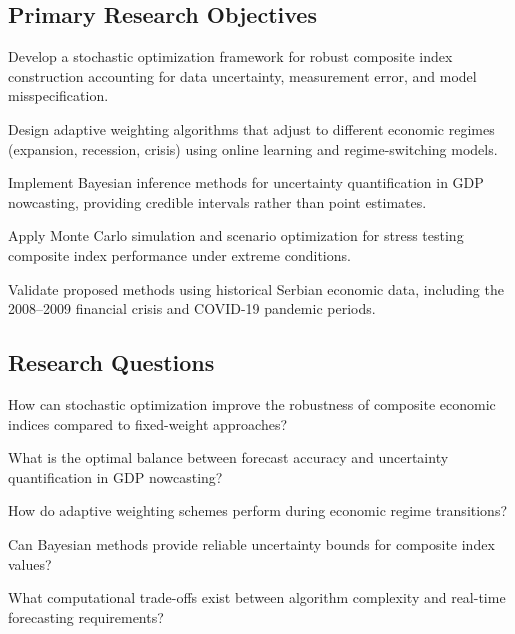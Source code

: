 \documentclass[12pt,a4paper]{article}
\begin{document}
\subsection{Primary Research Objectives}

\begin{description}[leftmargin=!,labelwidth=1cm]
    \item[RO1] Develop a stochastic optimization framework for robust composite index construction accounting for data uncertainty, measurement error, and model misspecification.
    
    \item[RO2] Design adaptive weighting algorithms that adjust to different economic regimes (expansion, recession, crisis) using online learning and regime-switching models.
    
    \item[RO3] Implement Bayesian inference methods for uncertainty quantification in GDP nowcasting, providing credible intervals rather than point estimates.
    
    \item[RO4] Apply Monte Carlo simulation and scenario optimization for stress testing composite index performance under extreme conditions.
    
    \item[RO5] Validate proposed methods using historical Serbian economic data, including the 2008--2009 financial crisis and COVID-19 pandemic periods.
\end{description}

\subsection{Research Questions}

\begin{description}[leftmargin=!,labelwidth=1cm]
    \item[RQ1] How can stochastic optimization improve the robustness of composite economic indices compared to fixed-weight approaches?
    
    \item[RQ2] What is the optimal balance between forecast accuracy and uncertainty quantification in GDP nowcasting?
    
    \item[RQ3] How do adaptive weighting schemes perform during economic regime transitions?
    
    \item[RQ4] Can Bayesian methods provide reliable uncertainty bounds for composite index values?
    
    \item[RQ5] What computational trade-offs exist between algorithm complexity and real-time forecasting requirements?
\end{description}
\end{document}
